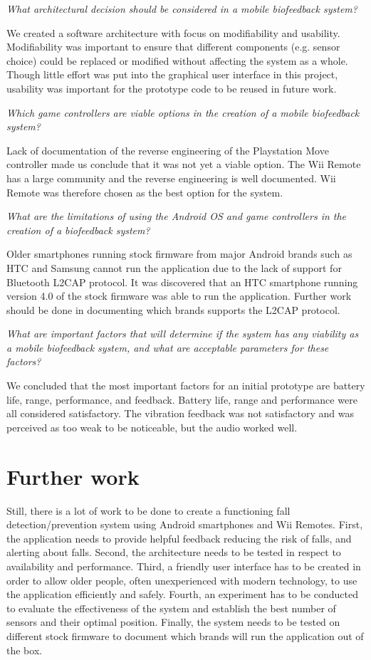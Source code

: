 \textit{What architectural decision should be considered in a mobile biofeedback system?}

We created a software architecture with focus on modifiability and usability. Modifiability was important to ensure that different components (e.g. sensor choice) could be replaced or modified without affecting the system as a whole. Though little effort was put into the graphical user interface in this project, usability was important for the prototype code to be reused in future work. 

\textit{Which game controllers are viable options in the creation of a mobile biofeedback system?}

Lack of documentation of the reverse engineering of the Playstation Move controller made us conclude that it was not yet a viable option. The Wii Remote has a large community and the reverse engineering is well documented. Wii Remote was therefore chosen as the best option for the system.

\textit{What are the limitations of using the Android OS and game controllers in the creation of a biofeedback system?}

Older smartphones running stock firmware from major Android brands such as HTC and Samsung cannot run the application due to the lack of support for Bluetooth L2CAP protocol. It was discovered that an HTC smartphone running version 4.0 of the stock firmware was able to run the application. Further work should be done in documenting which brands supports the L2CAP protocol.


\textit{What are important factors that will determine if the system has any viability as a mobile biofeedback system, and what are acceptable parameters for these factors?}


We concluded that the most important factors for an initial prototype are battery life, range, performance, and feedback. Battery life, range and performance were all considered satisfactory. The vibration feedback was not satisfactory and was perceived as too weak to be noticeable, but the audio worked well.

\section{Further work}
Still, there is a lot of work to be done to create a functioning fall detection/prevention system using Android smartphones and Wii Remotes. First, the application needs to provide helpful feedback reducing the risk of falls, and alerting about falls. Second, the architecture needs to be tested in respect to availability and performance. Third, a friendly user interface has to be created in order to allow older people, often unexperienced with modern technology, to use the application efficiently and safely. Fourth, an experiment has to be conducted to evaluate the effectiveness of the system and establish the best number of sensors and their optimal position. Finally, the system needs to be tested on different stock firmware to document which brands will run the application out of the box.